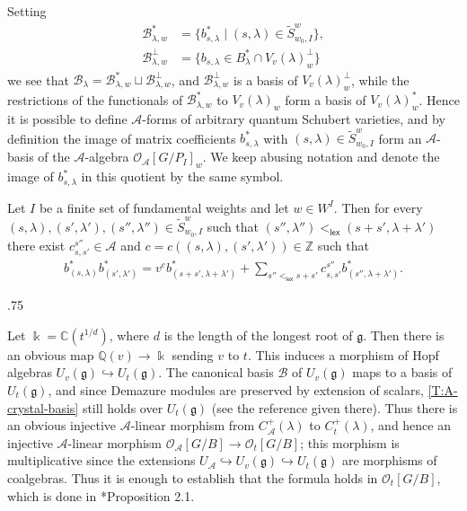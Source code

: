 \documentclass[11pt,fleqn]{article}
\makeatletter
\renewenvironment{proof}[1][\textit{Proof}]{\par
  \pushQED{\qed}%
  \normalfont \topsep.75\paraskip\relax
  \trivlist
  \item[\hskip\labelsep
        \itshape
    #1\@addpunct{.}]\ignorespaces
}{%
  \popQED\endtrivlist\@endpefalse
}
\newcommand\CC{\mathbb C}
\newcommand\QQ{\mathbb Q}
\newcommand\ZZ{\mathbb Z}
\renewcommand\to{\longrightarrow}
\newcommand\A{\mathcal A}
\newcommand\B{\mathcal B}
\renewcommand\O{\mathcal O}
\renewcommand\k{\Bbbk}
\newcommand\g{\mathfrak g}
\DeclareMathOperator\lex{\mathsf{lex}}
\makeatother
\begin{document}
Setting 
\begin{align*} 
\B_{\lambda, w}^* 
  &= \{b_{s, \lambda}^* \mid (s, \lambda) \in \tilde S_{w_0, I}^w \}, \\ 
\B_{\lambda, w}^\perp 
  &= \{b_{s, \lambda} \in B_\lambda^* \cap V_v(\lambda)_w^\perp\} 
\end{align*} 
we see that $\B_\lambda = \B_{\lambda, w}^* \sqcup \B_{\lambda, w}^\perp$, and 
$\B_{\lambda, w}^\perp$ is a basis of $V_v(\lambda)_w^\perp$, while the restrictions of 
the functionals of $\B_{\lambda, w}^*$ to $V_v(\lambda)_w$ form a basis of 
$V_v(\lambda)_w^*$.  Hence it is possible to define $\A$-forms of arbitrary quantum 
Schubert varieties, and by definition the image of matrix coefficients $b_{s, \lambda}^*$
with $(s, \lambda) \in \tilde S_{w_0, I}^w$ form an $\A$-basis of the $\A$-algebra 
$\O_\A[G/P_I]_w$. We keep abusing notation and denote the image of $b_{s, \lambda}^*$ in 
this quotient by the same symbol.

\begin{Proposition} 
\label{P:basis-product} 
Let $I$ be a finite set of fundamental weights and let $w \in W^I$. Then for every $(s,
\lambda), (s', \lambda'), (s'', \lambda'') \in \tilde S_{w_0, I}^w$ such that $(s'',
\lambda'') <_{\lex} (s + s', \lambda + \lambda')$ there exist $c_{s, s'}^{s''} \in \A$ 
and $c = c((s,\lambda),(s',\lambda')) \in \ZZ$ such that 
\begin{align}
\label{product-formula} 
b_{(s, \lambda)}^* b_{(s', \lambda')}^* 
  = v^c b_{(s+s', \lambda + \lambda')}^* 
    + \sum_{s'' <_{\lex} s+s'} c_{s,s'}^{s''} b_{(s'', \lambda + \lambda')}^*.  
\end{align} 
\end{Proposition} 
\begin{proof} 
Let $\k = \CC(t^{1/d})$, where $d$ is the length of the longest root of $\g$. Then there
is an obvious map $\QQ(v) \to \k$ sending $v$ to $t$. This induces a morphism of
Hopf algebras $U_v(\g) \hookrightarrow U_t(\g)$. The canonical basis $\B$ of $U_v(\g)$
maps to a basis of $U_t(\g)$, and since Demazure modules are preserved by extension of
scalars, \ref{T:A-crystal-basis} still holds over $U_t(\g)$ (see the reference given
there). Thus there is an obvious injective $\A$-linear morphism from $C_\A^+(\lambda)$ to
$C_t^+(\lambda)$, and hence an injective $\A$-linear morphism $\O_\A[G/B] \to \O_t[G/B]$;
this morphism is multiplicative since the extensions $U_\A \hookrightarrow U_v(\g)
\hookrightarrow U_t(\g)$ are morphisms of coalgebras. Thus it is enough to establish that
the formula holds in $\O_t[G/B]$, which is done in \cite{C}*{Proposition 2.1}.
\end{proof} 
\end{document}
